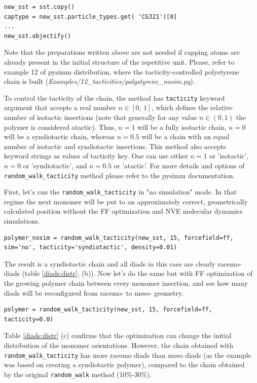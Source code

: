 \documentclass[9pt,tutorial]{livecoms}
\begin{document}
\begin{lstlisting}
new_sst = sst.copy()
captype = new_sst.particle_types.get( 'CG321')[0]
...
new_sst.objectify()
\end{lstlisting}

Note that the preparations written above are not needed if capping atoms are already present in the initial structure of the repetitive unit. Please, refer to example 12 of pysimm distribution, where the tacticity-controlled polystyrene chain is built  (\textit{Examples/12\_tacticities/polystyrene\_nosim.py}).

To control the tacticity of the chain, the method has \lstinline$tacticity$ keyword argument that accepts a real number $n \in [0,\ 1]$, which defines the relative number of isotactic insertions (note that generally for any value $n \in (0, 1)$ the polymer is considered atactic). Thus, $n = 1$ will be a fully isotactic chain, $n = 0$ will be a syndiotactic chain, whereas $n = 0.5$ will be a chain with an equal number of isotactic and syndiotactic insertions. This method also accepts keyword strings as values of tacticity key. One can use either $n = 1$ or 'isotactic', $n = 0$ or 'syndiotactic', and $n = 0.5$ or 'atactic'. For more details and options of \lstinline$random_walk_tacticity$ method please refer to the pysimm documentation.

First, let's run the \lstinline$random_walk_tacticity$ in "no simulation" mode. In that regime the next monomer will be put to an approximately correct, geometrically calculated position without the FF optimization and NVE molecular dynamics simulations.

\begin{lstlisting}
polymer_nosim = random_walk_tacticity(new_sst, 15, forcefield=ff, sim='no', tacticity='syndiotactic', density=0.01)
\end{lstlisting}

The result is a syndiotactic chain and all diads in this case are clearly racemo- diads (table \ref{diads:distr}, (b)). Now let's do the same but with FF optimization of the growing polymer chain between every monomer insertion, and see how many diads will be reconfigured from racemo- to meso- geometry.

\begin{lstlisting}
polymer = random_walk_tacticity(new_sst, 15, forcefield=ff, tacticity=0.0)
\end{lstlisting}

Table \ref{diads:distr} (c) confirms that the optimization can change the initial distribution of the monomer orientations. However, the chain obtained with \lstinline$random_walk_tacticity$ has more racemo diads than meso diads (as the example was based on creating a syndiotactic polymer), compared to the chain obtained by the original \lstinline$random_walk$ method (10\%-30\%).
\end{document}
